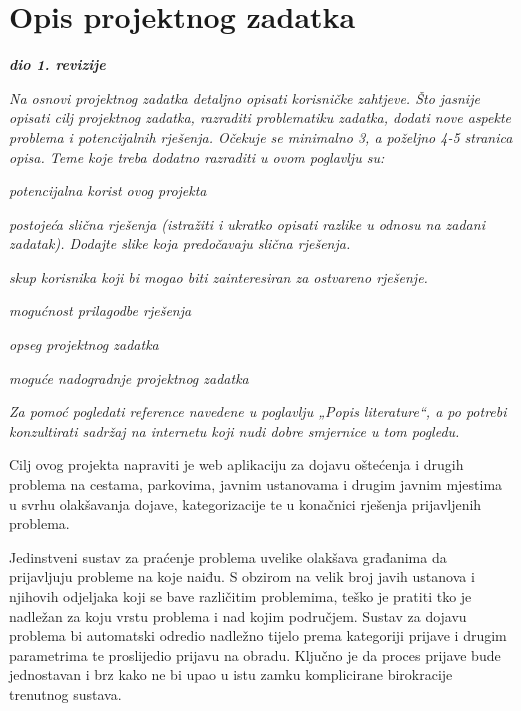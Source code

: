 \chapter{Opis projektnog zadatka}
		
			
			\textbf{\textit{dio 1. revizije}}\\
			
			{\color{red}\textit{Na osnovi projektnog zadatka detaljno opisati korisničke zahtjeve. Što jasnije opisati cilj projektnog zadatka, razraditi problematiku zadatka, dodati nove aspekte problema i potencijalnih rješenja. Očekuje se minimalno 3, a poželjno 4-5 stranica opisa.	Teme koje treba dodatno razraditi u ovom poglavlju su:}
			\begin{packed_item}
				\item \textit{potencijalna korist ovog projekta}
				\item \textit{postojeća slična rješenja (istražiti i ukratko opisati razlike u odnosu na zadani zadatak). Dodajte slike koja predočavaju slična rješenja.}
				\item \textit{skup korisnika koji bi mogao biti zainteresiran za ostvareno rješenje.}
				\item \textit{mogućnost prilagodbe rješenja }
				\item \textit{opseg projektnog zadatka}
				\item \textit{moguće nadogradnje projektnog zadatka}
			\end{packed_item}
			
			\textit{Za pomoć pogledati reference navedene u poglavlju „Popis literature“, a po potrebi konzultirati sadržaj na internetu koji nudi dobre smjernice u tom pogledu.}
			\eject
		}
		
		Cilj ovog projekta napraviti je web aplikaciju za dojavu oštećenja i drugih problema na cestama, parkovima, javnim ustanovama i drugim javnim mjestima u svrhu olakšavanja dojave, kategorizacije te u konačnici rješenja prijavljenih problema.
		
		Jedinstveni sustav za praćenje problema uvelike olakšava građanima da prijavljuju probleme na koje naiđu. S obzirom na velik broj javih ustanova i njihovih odjeljaka koji se bave različitim problemima, teško je pratiti tko je nadležan za koju vrstu problema i nad kojim područjem. Sustav za dojavu problema bi automatski odredio nadležno tijelo prema kategoriji prijave i drugim parametrima te proslijedio prijavu na obradu. Ključno je da proces prijave bude jednostavan i brz kako ne bi upao u istu zamku komplicirane birokracije trenutnog sustava.
		
